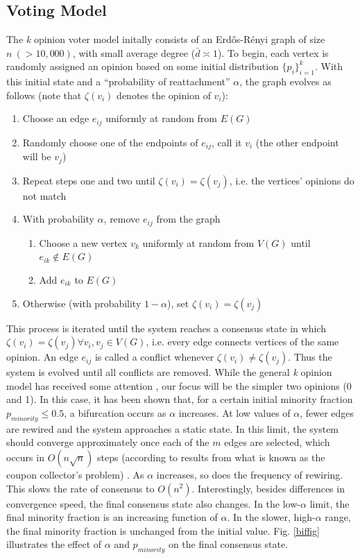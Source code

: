 \documentclass[11pt]{article}
\begin{document}
\subsection{Voting Model}
The \textit{k} opinion voter model initally consists of an Erd\H{o}s-R\'{e}nyi graph of size $n \ (>10,000)$, with small average degree ($\bar{d}\asymp 1$). To begin, each vertex is randomly assigned an opinion based on some initial distribution $\{p_{i}\}_{i=1}^{k}$. With this initial state and a ``probability of reattachment'' $\alpha$, the graph evolves as follows (note that $\zeta(v_{i})$ denotes the opinion of $v_{i}$):
\begin{enumerate}
\item Choose an edge $e_{ij}$ uniformly at random from $E(G)$
\item Randomly choose one of the endpoints of $e_{ij}$, call it $v_{i}$ (the other endpoint will be $v_{j}$)
\item Repeat steps one and two until $\zeta(v_{i}) = \zeta(v_{j})$, i.e. the vertices' opinions do not match
\item With probability $\alpha$, remove $e_{ij}$ from the graph
\begin{enumerate}
\item Choose a new vertex $v_{k}$ uniformly at random from $V(G)$ until $e_{ik} \notin E(G)$ 
\item Add $e_{ik}$ to $E(G)$
\end{enumerate}
\item Otherwise (with probability $1-\alpha$), set $\zeta(v_{i}) = \zeta(v_{j})$
\end{enumerate}
This process is iterated until the system reaches a consensus state in which $\zeta(v_{i}) = \zeta(v_{j}) \forall v_{i}, v_{j} \in V(G)$, i.e. every edge connects vertices of the same opinion. An edge $e_{ij}$ is called a conflict whenever $\zeta(v_{i}) \ne \zeta(v_{j})$. Thus the system is evolved until all conflicts are removed. While the general \textit{k} opinion model has received some attention \cite{durretts preprint?}, our focus will be the simpler two opinions (0 and 1). In this case, it has been shown that, for a certain initial minority fraction $p_{minority} \le 0.5$, a bifurcation occurs as $\alpha$ increases. At low values of $\alpha$, fewer edges are rewired and the system approaches a static state. In this limit, the system should converge approximately once each of the $m$ edges are selected, which occurs in $O(n\sqrt{n})$ steps (according to results from what is known as the coupon collector's problem) \cite{durrett}. As $\alpha$ increases, so does the frequency of rewiring. This slows the rate of consensus to $O(n^{2})$. Interestingly, besides differences in convergence speed, the final consensus state also changes. In the low-$\alpha$ limit, the final minority fraction is an increasing function of $\alpha$. In the slower, high-$\alpha$ range, the final minority fraction is unchanged from the initial value. Fig. \ref{biffig} illustrates the effect of $\alpha$ and $p_{minority}$ on the final consensus state.\vspace{1mm}\\
\end{document}

